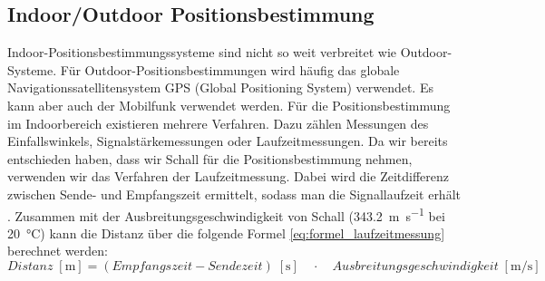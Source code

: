 \subsection{Indoor/Outdoor Positionsbestimmung}
Indoor-Positionsbestimmungssysteme sind nicht so weit verbreitet wie Outdoor-Systeme. Für Outdoor-Positionsbestimmungen wird häufig das globale Navigationssatellitensystem GPS (Global Positioning System) verwendet. Es kann aber auch der Mobilfunk verwendet werden. Für die Positionsbestimmung im Indoorbereich existieren mehrere Verfahren. Dazu zählen Messungen des Einfallswinkels, Signalstärkemessungen oder Laufzeitmessungen. Da wir bereits entschieden haben, dass wir Schall für die Positionsbestimmung nehmen, verwenden wir das Verfahren der Laufzeitmessung. Dabei wird die Zeitdifferenz zwischen Sende- und Empfangszeit ermittelt, sodass man die Signallaufzeit erhält \cite{src_INDOOR_OUTDOOR_SYSTEME}. Zusammen mit der Ausbreitungsgeschwindigkeit von Schall (\SI{343,2}{\metre\per\second} bei \SI{20}{\degreeCelsius}) kann die Distanz über die folgende Formel \ref{eq:formel_laufzeitmessung} berechnet werden:
\begin{equation}
	Distanz \;[\si{\metre}] = (Empfangszeit - Sendezeit)\;[\si{\second}]\quad \cdot \quad Ausbreitungsgeschwindigkeit \;[\si{\metre\per\second}]
   \label{eq:formel_laufzeitmessung}
\end{equation}

